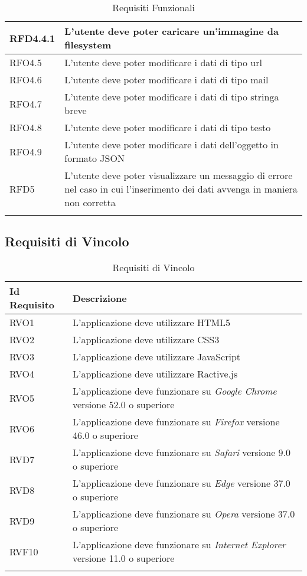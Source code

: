 \begin{longtable}{|l|m{11cm}|}
RFD4.4.1 & L'utente deve poter caricare un'immagine da filesystem \\ \hline
RFO4.5 & L'utente deve poter modificare i dati di tipo url \\ \hline
RFO4.6 & L'utente deve poter modificare i dati di tipo mail \\ \hline
RFO4.7 & L'utente deve poter modificare i dati di tipo stringa breve \\ \hline
RFO4.8 & L'utente deve poter modificare i dati di tipo testo \\ \hline
RFO4.9 & L'utente deve poter modificare i dati dell'oggetto in formato JSON \\ \hline
RFD5 & L'utente deve poter visualizzare un messaggio di errore nel caso in cui l'inserimento dei dati avvenga in maniera non corretta \\ \hline

\caption[Requisiti Funzionali]{Requisiti Funzionali}
\label{tabella:req0}
\end{longtable}
\clearpage
\subsection{Requisiti di Vincolo}
\normalsize
\begin{longtable}{|l|m{11cm}|}
\hline
\textbf{Id Requisito} & \textbf{Descrizione} \\
\hline
\endhead
RVO1 & L'applicazione deve utilizzare HTML5 \\ \hline
RVO2 & L'applicazione deve utilizzare CSS3 \\ \hline
RVO3 & L'applicazione deve utilizzare JavaScript \\ \hline
RVO4 & L'applicazione deve utilizzare Ractive.js \\ \hline
RVO5 & L'applicazione deve funzionare su \textit{Google Chrome} versione 52.0 o superiore \\ \hline
RVO6 & L'applicazione deve funzionare su \textit{Firefox} versione 46.0 o superiore \\ \hline
RVD7 & L'applicazione deve funzionare su \textit{Safari} versione 9.0 o superiore \\ \hline
RVD8 & L'applicazione deve funzionare su \textit{Edge} versione 37.0 o superiore \\ \hline
RVD9 & L'applicazione deve funzionare su \textit{Opera} versione 37.0 o superiore \\ \hline
RVF10 & L'applicazione deve funzionare su \textit{Internet Explorer} versione 11.0 o superiore \\ \hline
\caption[Requisiti di Vincolo]{Requisiti di Vincolo}
\label{tabella:req1}
\end{longtable}
